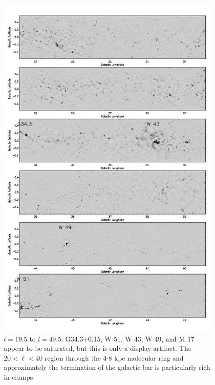 \documentclass[12pt,preprint]{aastex}
\newcommand{\lon}{\ensuremath{l}}
\begin{document}
\renewcommand{\thefigure}{\arabic{figure}\alph{subfig}}
\addtocounter{figure}{-1}
\addtocounter{subfig}{1}

\begin{figure}
  \begin{minipage}{6.5in} 
    \begin{center}
      \includegraphics[scale=0.8]{f19b} 
      \caption{$\lon=19.5$ to $\lon=49.5$.  G34.3+0.15, W 51, W 43, W
	49, and M 17 appear to be saturated, but this is only a
	display artifact.  The $20 < \ell < 40$ region through the 4-8
	kpc molecular ring and approximately the termination of the
	galactic bar is particularly rich in clumps.}
    \end{center}
  \end{minipage}
\end{figure}
\end{document}
